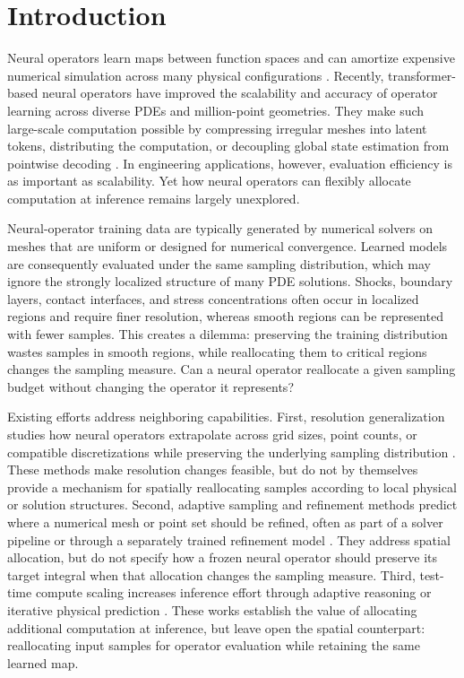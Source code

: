\section{Introduction}

Neural operators learn maps between function spaces and can amortize expensive numerical simulation across many physical configurations \citep{li2021fno,li2023gino,wu2024transolver}. Recently, transformer-based neural operators have improved the scalability and accuracy of operator learning across diverse PDEs and million-point geometries. They make such large-scale computation possible by compressing irregular meshes into latent tokens, distributing the computation, or decoupling global state estimation from pointwise decoding \citep{alkin2024upt,luo2025transolverpp,zhou2026transolver3}. In engineering applications, however, evaluation efficiency is as important as scalability. Yet how neural operators can flexibly allocate computation at inference remains largely unexplored.

Neural-operator training data are typically generated by numerical solvers on meshes that are uniform or designed for numerical convergence. Learned models are consequently evaluated under the same sampling distribution, which may ignore the strongly localized structure of many PDE solutions. Shocks, boundary layers, contact interfaces, and stress concentrations often occur in localized regions and require finer resolution, whereas smooth regions can be represented with fewer samples. This creates a dilemma: preserving the training distribution wastes samples in smooth regions, while reallocating them to critical regions changes the sampling measure. Can a neural operator reallocate a given sampling budget without changing the operator it represents?


Existing efforts address neighboring capabilities. First, resolution
generalization studies how neural operators extrapolate across grid sizes,
point counts, or compatible discretizations while preserving the underlying
sampling distribution \citep{li2021fno,li2023gino,liu2023nuno,alkin2024upt,
zhou2026transolver3,gao2025discretization}. These methods make resolution
changes feasible, but do not by themselves provide a mechanism for spatially reallocating samples according to local physical or solution structures. Second, adaptive sampling and refinement
methods predict where a numerical mesh or point set should be refined, often
as part of a solver pipeline or through a separately trained refinement model
\citep{huang2021meshgeneration,obiols2023adarnet,rowbottom2024gadaptivity}.
They address spatial allocation, but do not specify how a frozen neural
operator should preserve its target integral when that allocation changes the
sampling measure. Third, test-time compute scaling increases inference effort
through adaptive reasoning or iterative physical prediction
\citep{snell2024scalingllmtesttime,lippe2023pderefiner,jenkins2026atca,
serrano2026splitting}. These works establish the value of allocating additional
computation at inference, but leave open the spatial counterpart: reallocating
input samples for operator evaluation while retaining the same learned map.

